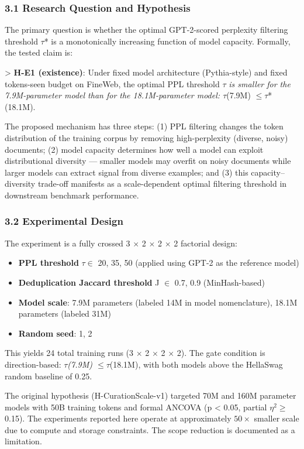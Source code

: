 
\subsubsection{3.1 Research Question and Hypothesis}

The primary question is whether the optimal GPT-2-scored perplexity filtering threshold $\tau$* is a monotonically increasing function of model capacity. Formally, the tested claim is:

> \textbf{H-E1 (existence)}: Under fixed model architecture (Pythia-style) and fixed tokens-seen budget on FineWeb, the optimal PPL threshold $\tau$\textit{ is smaller for the 7.9M-parameter model than for the 18.1M-parameter model: $\tau$}(7.9M) $\leq \tau$*(18.1M).

The proposed mechanism has three steps: (1) PPL filtering changes the token distribution of the training corpus by removing high-perplexity (diverse, noisy) documents; (2) model capacity determines how well a model can exploit distributional diversity --- smaller models may overfit on noisy documents while larger models can extract signal from diverse examples; and (3) this capacity--diversity trade-off manifests as a scale-dependent optimal filtering threshold in downstream benchmark performance.

\subsubsection{3.2 Experimental Design}

The experiment is a fully crossed 3 $\times$ 2 $\times$ 2 $\times$ 2 factorial design:
\begin{itemize}
\item \textbf{PPL threshold} $\tau \in$ {20, 35, 50} (applied using GPT-2 as the reference model)
\item \textbf{Deduplication Jaccard threshold} J $\in$ {0.7, 0.9} (MinHash-based)
\item \textbf{Model scale}: 7.9M parameters (labeled 14M in model nomenclature), 18.1M parameters (labeled 31M)
\item \textbf{Random seed}: {1, 2}
\end{itemize}

This yields 24 total training runs (3 $\times$ 2 $\times$ 2 $\times$ 2). The gate condition is direction-based: $\tau$\textit{(7.9M) $\leq \tau$}(18.1M), with both models above the HellaSwag random baseline of 0.25.

The original hypothesis (H-CurationScale-v1) targeted 70M and 160M parameter models with 50B training tokens and formal ANCOVA (p < 0.05, partial $\eta^2 \geq$ 0.15). The experiments reported here operate at approximately $50\times$ smaller scale due to compute and storage constraints. The scope reduction is documented as a limitation.

